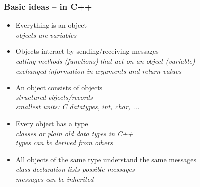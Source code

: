 \documentclass{slides}
\begin{document}
\begin{frame}
  \frametitle{Basic ideas -- in C++}

  \begin{itemize}
  \item \alert{Everything is an object}\\
    \emph{objects are variables}
  \item \alert{Objects interact by sending/receiving messages}\\
    \emph{calling methods (functions) that act on an object (variable)}\\
    \emph{exchanged information in arguments and return values}
  \item \alert{An object consists of objects}\\
    \emph{structured objects/records}\\
    \emph{smallest units: C datatypes, int, char, ...}\\
  \item \alert{Every object has a type}\\
    \emph{classes or plain old data types in C++}\\
    \emph{types can be derived from others }
  \item \alert{All objects of the same type understand the same messages}\\
    \emph{class declaration lists possible messages}\\
    \emph{messages can be inherited}
  \end{itemize}
\end{frame}
\end{document}
